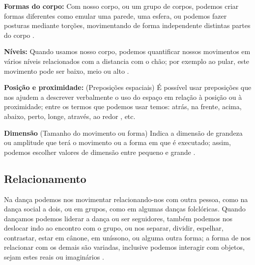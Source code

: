 \textbf{Formas do corpo:} Com nosso corpo, ou um grupo de corpos, podemos criar formas diferentes 
como emular uma parede, uma esfera, 
ou podemos fazer posturas mediante torções, 
movimentando de forma independente distintas partes do corpo 
\cite[pp. 8]{carline2011lesson}
\cite[pp. 32]{paine2014complete}
\cite[pp. 97]{schrader2005sense}.

\textbf{Níveis:} Quando usamos nosso corpo, 
podemos quantificar nossos movimentos em vários níveis 
relacionados com a distancia com o chão;
por exemplo ao pular, este movimento pode ser baixo, meio ou alto 
\cite[pp. 8]{carline2011lesson}
\cite[pp. 32]{paine2014complete}
\cite[pp. 96]{schrader2005sense}.

\textbf{Posição e proximidade:}  (Preposições espaciais)
É possível usar preposições que nos ajudem a descrever verbalmente o uso do espaço
em relação à posição ou à proximidade; entre os termos que podemos usar temos:
atrás, na frente, 
acima, abaixo, 
perto, longe, 
através, ao redor
\cite[pp. 32]{paine2014complete} 
\cite[pp. 9]{carline2011lesson}, etc.

\textbf{Dimensão} (Tamanho do movimento ou forma) 
Indica a dimensão de grandeza ou amplitude que terá o movimento ou a forma em que é executado;
assim, podemos escolher valores de dimensão entre pequeno e grande 
\cite[pp. 32]{paine2014complete} 
\cite[pp. 99]{schrader2005sense}.



\subsection{Relacionamento} 
Na dança podemos nos movimentar relacionando-nos com outra pessoa, como na dança social a  dois,
ou em grupos, como em algumas danças folclóricas.
Quando dançamos podemos liderar a dança ou ser seguidores, 
também podemos nos deslocar indo ao encontro com o grupo, 
ou nos separar, dividir, espelhar, contrastar, 
estar em cânone, em uníssono, ou alguma outra forma;
a forma de nos relacionar com os demais são variadas,
inclusive podemos interagir com objetos, sejam estes reais ou imaginários
 \cite[pp. 9]{carline2011lesson}
 \cite[pp. 27, 32-33]{paine2014complete}
\cite[pp. 131, 132, 134]{mccutchen2006teaching}.


